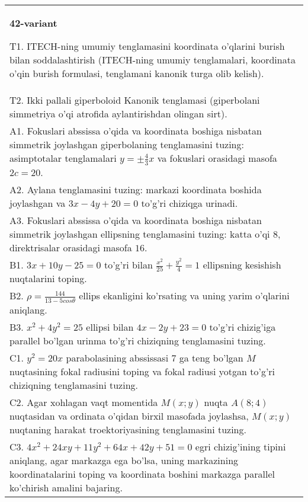 \documentclass{article}
\begin{document}
\begin{tabular}{m{17cm}}
\textbf{42-variant}
\newline

T1. ITECH-ning umumiy tenglamasini koordinata o'qlarini burish bilan soddalashtirish (ITECH-ning umumiy tenglamalari, koordinata o'qin burish formulasi, tenglamani kanonik turga olib kelish).\\

T2. Ikki pallali giperboloid Kanonik tenglamasi (giperbolani simmetriya o'qi atrofida aylantirishdan olingan sirt).\\

A1. Fokuslari abssissa o'qida va koordinata boshiga nisbatan simmetrik joylashgan giperbolaning tenglamasini tuzing: asimptotalar tenglamalari $y=\pm \frac{4}{3}x$ va fokuslari orasidagi masofa $2c=20$.\\

A2. Aylana tenglamasini tuzing: markazi koordinata boshida joylashgan va $3x-4y+20=0$ to'g'ri chiziqga urinadi.\\

A3. Fokuslari abssissa o'qida va koordinata boshiga nisbatan simmetrik joylashgan ellipsning tenglamasini tuzing: katta o'qi $8$, direktrisalar orasidagi masofa $16$.\\

B1. $3x + 10y - 25 = 0$ to'g'ri bilan $\frac{x^{2}}{25} + \frac{y^{2}}{4} = 1$ ellipsning kesishish nuqtalarini toping.  \\

B2. $\rho = \frac{144}{13 - 5cos\theta}$ ellips ekanligini ko'rsating va uning yarim o'qlarini aniqlang.\\

B3. $x^{2} + 4y^{2} = 25$ ellipsi bilan $4x - 2y + 23 = 0$ to'g'ri chizig'iga parallel bo'lgan urinma to'g'ri chiziqning tenglamasini tuzing.  \\

C1. $y^{2} = 20x$ parabolasining abssissasi 7 ga teng bo'lgan $M$ nuqtasining fokal radiusini toping va fokal radiusi yotgan to'g'ri chiziqning tenglamasini tuzing.  \\

C2. Agar xohlagan vaqt momentida $M(x;y)$ nuqta $A(8;4)$ nuqtasidan va ordinata o'qidan birxil masofada joylashsa, $M(x;y)$ nuqtaning harakat troektoriyasining tenglamasini tuzing.  \\

C3. $4x^{2} + 24xy + 11y^{2} + 64x + 42y + 51 = 0$ egri chizig'ining tipini aniqlang, agar markazga ega bo'lsa, uning markazining koordinatalarini toping va koordinata boshini markazga parallel ko'chirish amalini bajaring.\\

\end{tabular}
\vspace{1cm}
\end{document}
